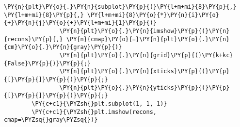 \begin{Verbatim}[commandchars=\\\{\}]
                \PY{n}{plt}\PY{o}{.}\PY{n}{subplot}\PY{p}{(}\PY{l+m+mi}{8}\PY{p}{,} \PY{l+m+mi}{8}\PY{p}{,} \PY{l+m+mi}{8}\PY{o}{*}\PY{n}{i}\PY{o}{+}\PY{n}{j}\PY{o}{+}\PY{l+m+mi}{1}\PY{p}{)}
                \PY{n}{plt}\PY{o}{.}\PY{n}{imshow}\PY{p}{(}\PY{n}{recons}\PY{p}{,} \PY{n}{cmap}\PY{o}{=}\PY{n}{plt}\PY{o}{.}\PY{n}{cm}\PY{o}{.}\PY{n}{gray}\PY{p}{)}
                \PY{n}{plt}\PY{o}{.}\PY{n}{grid}\PY{p}{(}\PY{k+kc}{False}\PY{p}{)}\PY{p}{;}
                \PY{n}{plt}\PY{o}{.}\PY{n}{xticks}\PY{p}{(}\PY{p}{[}\PY{p}{]}\PY{p}{)}\PY{p}{;}
                \PY{n}{plt}\PY{o}{.}\PY{n}{yticks}\PY{p}{(}\PY{p}{[}\PY{p}{]}\PY{p}{)}\PY{p}{;}
        \PY{c+c1}{\PYZsh{}plt.subplot(1, 1, 1)}
        \PY{c+c1}{\PYZsh{}plt.imshow(recons, cmap=\PYZsq{}gray\PYZsq{})}
\end{Verbatim}


    \begin{center}
    \end{center}
    { \hspace*{\fill} \\}
    
